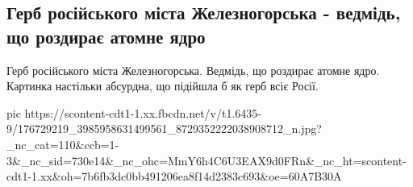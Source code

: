  
 
 
 
 
\subsection{Герб російського міста Железногорська - ведмідь, що роздирає атомне ядро}

Герб російського міста Железногорська. Ведмідь, що роздирає атомне ядро.
Картинка настільки абсурдна, що підійшла б як герб всіє Росії.


\ifcmt
  pic https://scontent-cdt1-1.xx.fbcdn.net/v/t1.6435-9/176729219_3985958631499561_8729352222038908712_n.jpg?_nc_cat=110&ccb=1-3&_nc_sid=730e14&_nc_ohc=MmY6h4C6U3EAX9d0FRn&_nc_ht=scontent-cdt1-1.xx&oh=7b6fb3dc0bb491206ea8f14d2383c693&oe=60A7B30A
\fi

